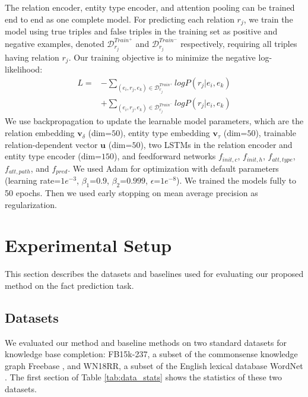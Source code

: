 \documentclass[letterpaper]{article} %
\begin{document}
The relation encoder, entity type encoder, and attention pooling can be trained end to end as one complete model. For predicting each relation $r_j$, we train the model using true triples and false triples in the training set as positive and negative examples, denoted $\mathcal{D}_{r_j}^{Train^{+}}$ and $\mathcal{D}_{r_j}^{Train^{-}}$ respectively, requiring all triples having relation $r_j$.  Our training objective is to minimize the negative log-likelihood:%
\begin{align}
	L = &- \sum_{(e_i, r_j, e_k) \in \mathcal{D}_{r_j}^{Train^{+}}} logP(r_j|e_i, e_k) \nonumber \\
	&+ \sum_{(e_i, r_j, e_k) \in \mathcal{D}_{r_j}^{Train^{-}}} logP(r_j|e_i, e_k)
\end{align} %
We use backpropagation to update the learnable model parameters, which are the relation embedding $\bm{v}_\delta$ (dim=$50$), entity type embedding $\bm{v}_\tau$ (dim=$50$), trainable relation-dependent vector $\bm{u}$ (dim=$50$), two LSTMs in the relation encoder and entity type encoder (dim=$150$), and feedforward networks $f_{init, c}$, $f_{init, h}$, $f_{att, type}$, $f_{att, path}$, and $f_{pred}$. We used Adam \cite{adam} for optimization with default parameters (learning rate=$1e^{-3}$, $\beta_1$=$0.9$, $\beta_2$=$0.999$, $\epsilon$=$1e^{-8}$). We trained the models fully to 50 epochs. Then we used early stopping on mean average precision as regularization. 

\section{Experimental Setup}
This section describes the datasets and baselines used for evaluating our proposed method on the fact prediction task.

\subsection{Datasets}
We evaluated our method and baseline methods on two standard datasets for knowledge base completion: FB15k-237, a subset of the commonsense knowledge graph Freebase \cite{freebase}, and WN18RR, a subset of the English lexical database WordNet \cite{wordnet}. The first section of Table \ref{tab:data_stats} shows the statistics of these two datasets. 
\end{document}

